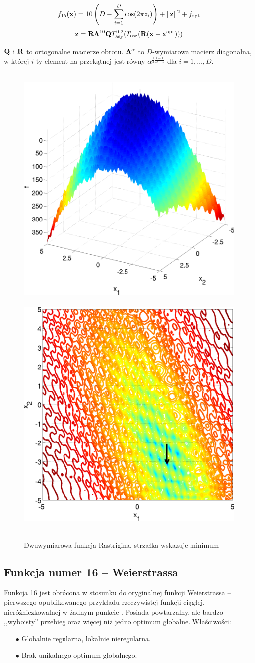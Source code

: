 \documentclass[a4paper,onecolumn,oneside,12pt,wide,floatssmall]{mwrep}
\newcommand{\norm}[1]{\lVert#1\rVert}
\theoremstyle{definition}
\theoremstyle{plain}%
\theoremstyle{remark}
\begin{document}
$$ f_{15}(\bold{x}) = 10 \left( D - \sum^D_{i=1}\cos(2 \pi z_i) \right) + \norm{\bold{z}}^2 + f_\text{opt} $$
$$ \bold{z} = \bold{R} \bold{\Lambda}^{10} \bold{Q} T^{0.2}_\text{asy}(T_\text{osz}(\bold{R}(\bold{x} - \bold{x}^\text{opt}))) $$ 

$\bold{Q}$ i $\bold{R}$ to ortogonalne macierze obrotu.
$\bold{\Lambda}^\alpha$ to $D$-wymiarowa macierz diagonalna, w której $i$-ty element na przekątnej jest równy 
$\alpha^{\frac{1}{2}\frac{i-1}{D-1}}$ dla $i = 1, \dots, D$.

\begin{figure}[H]
\centering
\mbox{
\includegraphics[width=.45\textwidth]{img/15.png} \quad
\includegraphics[width=.45\textwidth]{img/15a.png} 
}
\caption{Dwuwymiarowa funkcja Rastrigina, strzałka wskazuje minimum \cite{noiseless}}
\end{figure}

\subsection{Funkcja numer 16 -- Weierstrassa}

Funkcja 16 jest obrócona w stosunku do oryginalnej funkcji Weierstrassa -- pierwszego opublikowanego przykładu
rzeczywistej funkcji ciągłej, nieróżniczkowalnej w żadnym punkcie \cite{szarek}.
Posiada powtarzalny, ale bardzo ,,wyboisty'' przebieg oraz więcej niż jedno optimum globalne. Właściwości:
\begin{itemize}
 \item[$\bullet$] Globalnie regularna, lokalnie nieregularna.
 \item[$\bullet$] Brak unikalnego optimum globalnego.
\end{itemize} 
\end{document}

